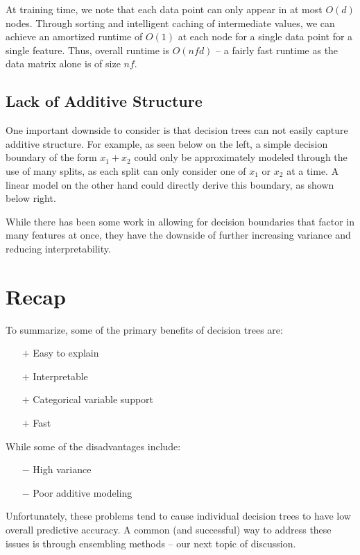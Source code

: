 \documentclass{article}
\begin{document}
At training time, we note that each data point can only appear in at most $O(d)$ nodes.  Through sorting and intelligent caching of intermediate values, we can achieve an amortized runtime of $O(1)$ at each node for a single data point for a single feature.  Thus, overall runtime is $O(nfd)$ -- a fairly fast runtime as the data matrix alone is of size $nf$.

\subsection{Lack of Additive Structure}

One important downside to consider is that decision trees can not easily capture additive structure.  For example, as seen below on the left, a simple decision boundary of the form $x_1 + x_2$ could only be approximately modeled through the use of many splits, as each split can only consider one of $x_1$ or $x_2$ at a time.  A linear model on the other hand could directly derive this boundary, as shown below right.


While there has been some work in allowing for decision boundaries that factor in many features at once, they have the downside of further increasing variance and reducing interpretability.
 
\pagebreak 
 
\section{Recap}

To summarize, some of the primary benefits of decision trees are:

\begin{itemize}
	\item[$+$] Easy to explain
	\item[$+$] Interpretable
	\item[$+$] Categorical variable support
	\item[$+$]Fast
\end{itemize}

While some of the disadvantages include:

\begin{itemize}
	\item[$-$] High variance
	\item[$-$] Poor additive modeling
\end{itemize}

Unfortunately, these problems tend to cause individual decision trees to have low overall predictive accuracy.  A common (and successful) way to address these issues is through ensembling methods -- our next topic of discussion.
\end{document}
